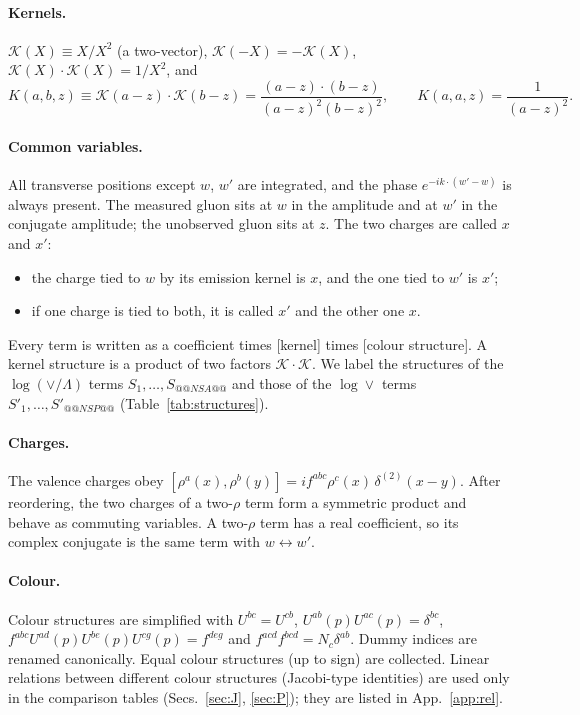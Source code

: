 \documentclass[10pt]{article}
\numberwithin{equation}{section}
\newcommand{\KK}{\mathcal K}
\begin{document}
\paragraph{Kernels.} $\KK(X)\equiv X/X^2$ (a two-vector), $\KK(-X)=-\KK(X)$, $\KK(X)\cdot\KK(X)=1/X^2$, and
\begin{equation}
K(a,b,z)\equiv\KK(a-z)\cdot\KK(b-z)=\frac{(a-z)\cdot(b-z)}{(a-z)^2(b-z)^2},\qquad K(a,a,z)=\frac{1}{(a-z)^2}.
\end{equation}

\paragraph{Common variables.} All transverse positions except $w$, $w'$ are integrated, and the phase $e^{-ik\cdot(w'-w)}$ is always present. The measured gluon sits at $w$ in the amplitude and at $w'$ in the conjugate amplitude; the unobserved gluon sits at $z$. The two charges are called $x$ and $x'$:
\begin{itemize}
\item the charge tied to $w$ by its emission kernel is $x$, and the one tied to $w'$ is $x'$;
\item if one charge is tied to both, it is called $x'$ and the other one $x$.
\end{itemize}
Every term is written as a coefficient times [kernel] times [colour structure]. A kernel structure is a product of two factors $\KK\cdot\KK$. We label the structures of the $\log(\vee/\Lambda)$ terms $S_1,\dots,S_{@@NSA@@}$ and those of the $\log\vee$ terms $S'_1,\dots,S'_{@@NSP@@}$ (Table~\ref{tab:structures}).

\paragraph{Charges.} The valence charges obey $[\rho^a(x),\rho^b(y)]=if^{abc}\rho^c(x)\,\delta^{(2)}(x-y)$. After reordering, the two charges of a two-$\rho$ term form a symmetric product and behave as commuting variables. A two-$\rho$ term has a real coefficient, so its complex conjugate is the same term with $w\leftrightarrow w'$.

\paragraph{Colour.} Colour structures are simplified with $U^{bc}=U^{cb}$, $U^{ab}(p)U^{ac}(p)=\delta^{bc}$, $f^{abc}U^{ad}(p)U^{be}(p)U^{cg}(p)=f^{deg}$ and $f^{acd}f^{bcd}=N_c\delta^{ab}$. Dummy indices are renamed canonically. Equal colour structures (up to sign) are collected. Linear relations between different colour structures (Jacobi-type identities) are used only in the comparison tables (Secs.~\ref{sec:J}, \ref{sec:P}); they are listed in App.~\ref{app:rel}.
\end{document}
